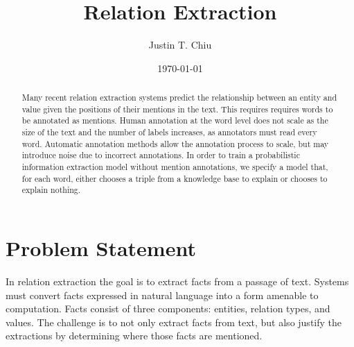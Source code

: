 \documentclass[12pt]{article}
\title{Relation Extraction}
\author{
Justin T. Chiu
}
\date{\today}
\begin{document}
\maketitle

\begin{abstract}
Many recent relation extraction systems predict the relationship between
an entity and value given the positions of their mentions in the text.
This requires requires words to be annotated as mentions.
Human annotation at the word level does not scale as the size of the text
and the number of labels increases, as annotators must read every word.
Automatic annotation methods allow the annotation process to scale,
but may introduce noise due to incorrect annotations.
In order to train a probabilistic information extraction model without mention
annotations, we specify a model that, for each word,
either chooses a triple from a knowledge base to explain or chooses to explain nothing.
\end{abstract}

\section{Problem Statement}
\begin{comment}
NOTE on RE vs KBP: KBP focuses on modeling the full database, whereas
in RE the emphasis is on explaining extractions.
KBP usually has a more complicated model over the KB,
while RE sometimes makes simplifying assumptions and could make a poor
KBP system.
Example: if triple double appears in text and someone scored < 10 PTS,
then it's more likely they more likely had > 10 REB.
The difference between RE and KBP is subtle. Both fall under
information extraction, and the models may overlap in many ways.
In fact, latent variable model approaches to RE are usually able to perform KBP as well.
However, the focus is usually not on having good aggregate extraction metrics,
but rather about identifying where facts are in text.
This leads to simplifying assumptions in the model of the KB itself.
On the other hand, KBP moves the difficulty from explaining extractions to
faithfully modeling the KB.
Typically this results in a challenging inference task, as the structure
of the KB may be very complex.
\end{comment}

In relation extraction the goal is to extract facts from a passage of text.
Systems must convert facts expressed in natural language into a form
amenable to computation.
Facts consist of three components: entities, relation types, and values.
The challenge is to not only extract facts from text, but also
justify the extractions by determining where those facts are mentioned.
\end{document}
